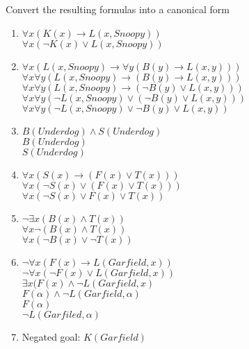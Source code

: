 \documentclass[12pt]{article}
\begin{document}
\noindent
Convert the resulting formulas into a canonical form
\begin{enumerate}
    \item $\forall x(K(x)\rightarrow L(x, Snoopy))$\\
          $\forall x(\lnot K(x)\lor L(x,Snoopy))$

    \item $\forall x (L(x, Snoopy)\rightarrow \forall y (B(y)\rightarrow L(x, y)))$\\
          $\forall x\forall y(L(x, Snoopy)\rightarrow (B(y)\rightarrow L(x,y)))$ \\
          $\forall x\forall y(L(x, Snoopy)\rightarrow (\lnot B(y)\lor L(x,y)))$ \\
          $\forall x\forall y(\lnot L(x, Snoopy)\lor (\lnot B(y)\lor L(x,y)))$ \\
          $\forall x\forall y(\lnot L(x, Snoopy)\lor \lnot B(y)\lor L(x,y))$

    \item $B(Underdog)\land S(Underdog)$\\
          $B(Underdog)$\\
          $S(Underdog)$

    \item $\forall x(S(x)\rightarrow (F(x)\lor T(x)))$\\
          $\forall x(\lnot S(x)\lor (F(x)\lor T(x)))$\\
          $\forall x(\lnot S(x)\lor F(x)\lor T(x))$

    \item $\lnot\exists x(B(x)\land T(x))$\\
          $\forall x\lnot(B(x)\land T(x))$\\
          $\forall x(\lnot B(x)\lor \lnot T(x))$

    \item $\lnot\forall x(F(x)\rightarrow L(Garfield, x))$\\
          $\lnot\forall x(\lnot F(x)\lor L(Garfield, x))$\\
          $\exists x (F(x)\land \lnot L(Garfield, x)$\\
          $F(\alpha)\land \lnot L(Garfield, \alpha)$\\
          $F(\alpha)$\\
          $\lnot L(Garfiled, \alpha)$

    \item Negated goal: $K(Garfield)$
\end{enumerate}
\end{document}
